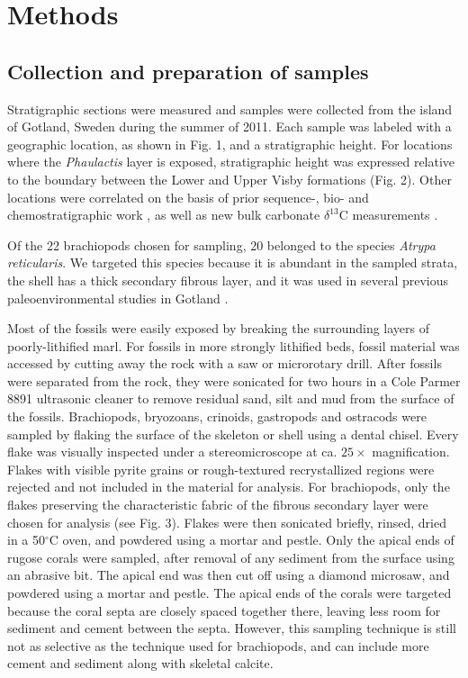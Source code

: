 \documentclass[preprint, authoryear]{elsarticle}
\begin{document}
\section{Methods}

\subsection{Collection and preparation of samples}

Stratigraphic sections were measured and samples were collected from the island of Gotland, Sweden during the summer of 2011. Each sample was labeled with a geographic location, as shown in Fig. 1, and a stratigraphic height. For locations where the \textit{Phaulactis} layer is exposed, stratigraphic height was expressed relative to the boundary between the Lower and Upper Visby formations (Fig. 2). Other locations were correlated on the basis of prior sequence-, bio- and chemostratigraphic work \citep{Calner2004a}, as well as new bulk carbonate $\delta^{13}$C measurements \citep{Fike2014}.

Of the 22 brachiopods chosen for sampling, 20 belonged to the species \textit{Atrypa reticularis}. We targeted this species because it is abundant in the sampled strata, the shell has a thick secondary fibrous layer, and it was used in several previous paleoenvironmental studies in Gotland \citep{Bickert1997, Munnecke2003, Samtleben2001}. 

Most of the fossils were easily exposed by breaking the surrounding layers of poorly-lithified marl. For fossils in more strongly lithified beds, fossil material was accessed by cutting away the rock with a saw or microrotary drill. After fossils were separated from the rock, they were sonicated for two hours in a Cole Parmer 8891 ultrasonic cleaner to remove residual sand, silt and mud from the surface of the fossils. Brachiopods, bryozoans, crinoids, gastropods and ostracods were sampled by flaking the surface of the skeleton or shell using a dental chisel. Every flake was visually inspected under a stereomicroscope at ca. $25\times$ magnification. Flakes with visible pyrite grains or rough-textured recrystallized regions were rejected and not included in the material for analysis. For brachiopods, only the flakes preserving the characteristic fabric of the fibrous secondary layer were chosen for analysis (see Fig. 3). Flakes were then sonicated briefly, rinsed, dried in a 50$^{\circ}$C oven, and powdered using a mortar and pestle. Only the apical ends of rugose corals were sampled, after removal of any sediment from the surface using an abrasive bit. The apical end was then cut off using a diamond microsaw, and powdered using a mortar and pestle. The apical ends of the corals were targeted because the coral septa are closely spaced together there, leaving less room for sediment and cement between the septa. However, this sampling technique is still not as selective as the technique used for brachiopods, and can include more cement and sediment along with skeletal calcite. 
\end{document}
